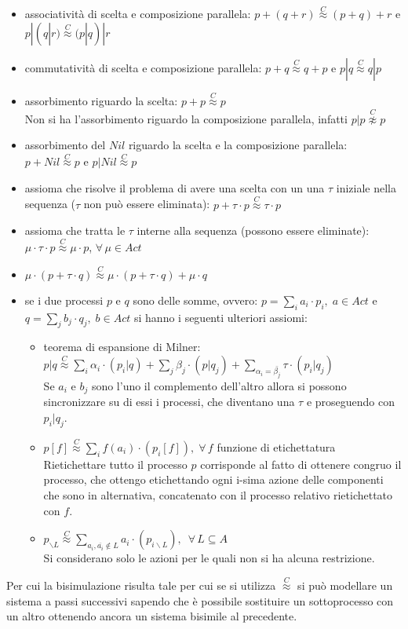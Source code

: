     \begin{itemize}
    \item associatività di scelta e composizione parallela:	$p+(q+r) \stackrel{C}{\approx} (p+q)+r$	e	$p|(q|r) \stackrel{C}{\approx} (p|q)|r$
    \item commutatività di scelta e composizione parallela:	$p+q \stackrel{C}{\approx} q+p$	e	$p|q \stackrel{C}{\approx} q|p$
    \item assorbimento riguardo la scelta:	$p+p \stackrel{C}{\approx} p$ \\
        Non si ha l’assorbimento riguardo la composizione parallela, infatti $p|p \stackrel{C}{\not \approx} p$
    \item assorbimento del $Nil$ riguardo la scelta e la composizione parallela:	$p+Nil \stackrel{C}{\approx} p$	e	$p|Nil \stackrel{C}{\approx} p$
    \item assioma che risolve il problema di avere una scelta con un una $\tau$ iniziale nella sequenza ($\tau$ non può essere eliminata): $p+\tau\cdot p \stackrel{C}{\approx} \tau\cdot p$
    \item assioma che  tratta le $\tau$ interne alla sequenza (possono essere eliminate):	$\mu\cdot \tau\cdot p \stackrel{C}{\approx} \mu\cdot p$, $\forall\,\mu\in Act$
    \item $\mu\cdot(p+\tau\cdot q) \stackrel{C}{\approx} \mu\cdot(p+\tau\cdot q)+\mu\cdot q$
    \item se i due processi $p$ e $q$ sono delle somme, ovvero: $\displaystyle p=\sum_i a_i\cdot p_i, \; a\in Act$ e $\displaystyle q=\sum_j b_j\cdot q_j,\; b\in Act$ si hanno i seguenti ulteriori assiomi:
        \begin{itemize}
            \item teorema di espansione di Milner:	$p|q \stackrel{C}{\approx} \displaystyle \sum_i \alpha_i\cdot (p_i|q)+\sum_j \beta_j \cdot (p|q_j) + \sum_{\alpha_i=\bar{\beta_j}} \tau \cdot(p_i|q_j)$\\
                Se $a_i$ e $b_j$ sono l’uno il complemento dell’altro allora si possono sincronizzare su di essi i processi, che diventano una $\tau$ e proseguendo con $p_i|q_j$.
            \item $\displaystyle p[f] \stackrel{C}{\approx} \sum_if(a_i)\cdot(p_i[f]), \; \forall\,f$ funzione di etichettatura\\
                Rietichettare tutto il processo $p$ corrisponde al fatto di ottenere congruo il processo, che ottengo etichettando ogni i-sima azione delle componenti che sono in alternativa, concatenato con il processo relativo rietichettato con $f$.
            \item $\displaystyle p_{\backslash L} \stackrel{C}{\approx} \sum_{a_i,\overline{a_i}\not\in L}a_i\cdot(p_{i\backslash L}),\,\,\,\forall\,L\subseteq A$\\
                Si considerano solo le azioni per le quali non si ha alcuna restrizione.
        \end{itemize}
\end{itemize}
Per cui la bisimulazione risulta tale per cui se si utilizza $\stackrel{C}{\approx}$ si può modellare un sistema a passi successivi sapendo che è possibile sostituire un sottoprocesso con un altro ottenendo ancora un sistema bisimile al precedente.